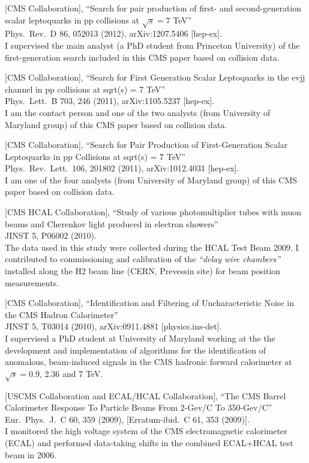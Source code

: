 \documentclass[10pt, a4paper]{article}
\begin{document}
\begin{thebibliography}{599}
[CMS Collaboration],
``Search for pair production of first- and second-generation scalar leptoquarks in pp collisions at $\sqrt{s}= 7$ TeV''\\
Phys.\ Rev.\ D 86, 052013 (2012), arXiv:1207.5406 [hep-ex]. 
\\I supervised the main analyst (a PhD student from Princeton University) of the first-generation search included in this CMS paper based on collision data. 

[CMS Collaboration],
 ``Search for First Generation Scalar Leptoquarks in the evjj channel in pp collisions at sqrt(s) = 7 TeV''\\
  Phys.\ Lett.\ B 703, 246 (2011), arXiv:1105.5237 [hep-ex].
  \\ I am the contact person and one of the two analysts (from University of Maryland group) of this CMS paper based on collision data.

[CMS Collaboration],
``Search for Pair Production of First-Generation Scalar Leptoquarks in pp Collisions at sqrt(s) = 7 TeV''\\
Phys.\ Rev.\ Lett.\  106, 201802 (2011), arXiv:1012.4031 [hep-ex].
\\I am one of the four analysts (from University of Maryland group) of this CMS paper based on collision data.

[CMS HCAL Collaboration],
``Study of various photomultiplier tubes with muon beams and Cherenkov light produced in electron showers''\\
 JINST 5, P06002 (2010).
  \\ The data used in this study were collected during the HCAL Test Beam 2009. I contributed to 
  commissioning and calibration of the {\it ``delay wire chambers''} installed along the H2 
  beam line (CERN, Prevessin site) for beam position measurements.

[CMS Collaboration],
 ``Identification and Filtering of Uncharacteristic Noise in the CMS Hadron Calorimeter''\\
  JINST 5, T03014 (2010), arXiv:0911.4881 [physics.ins-det].\\
I supervised a PhD student at University of Maryland working at the
the development and implementation of algorithms for the
identification of anomalous, beam-induced signals in the CMS hadronic 
forward calorimeter at $\sqrt{s}=$0.9, 2.36 and 7 TeV.

[USCMS Collaboration and ECAL/HCAL Collaboration],
``The CMS Barrel Calorimeter Response To Particle Beams From 2-Gev/C To 350-Gev/C''\\
Eur.\ Phys.\ J.\  C 60, 359 (2009), [Erratum-ibid.\  C 61, 353 (2009)].\\
I monitored the high voltage system of the CMS electromagnetic
calorimeter (ECAL) and performed data-taking shifts in the combined ECAL+HCAL test beam in 2006.


\end{thebibliography}
\end{document}
